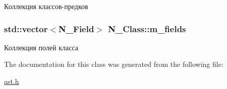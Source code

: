Коллекция классов-\/предков 

\hypertarget{classN__Class_acafc087764ee9469711513ff7abc132f}{}
\subsubsection[{m\+\_\+fields}]{\setlength{\rightskip}{0pt plus 5cm}std\+::vector$<${\bf N\+\_\+\+Field}$>$ N\+\_\+\+Class\+::m\+\_\+fields\hspace{0.3cm}{\ttfamily [protected]}}\label{classN__Class_acafc087764ee9469711513ff7abc132f}


Коллекция полей класса 



The documentation for this class was generated from the following file\+:\begin{DoxyCompactItemize}
\item 
\hyperlink{ast_8h}{ast.\+h}\end{DoxyCompactItemize}
